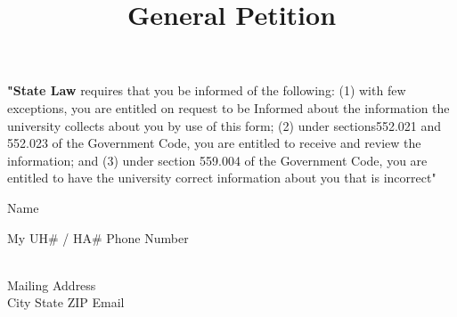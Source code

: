 \documentclass{article}
\begin{document}
\begin{Form}


\begin{multicols}{3}

\setlength{\hsize}{0.9\hsize}
\title*{\noindent \textbf{\Huge General Petition}}
\hfill
\columnbreak
\parbox{1.5\columnwidth}{\scriptsize{\textbf{"State Law} requires that you be informed of the following: (1) with few exceptions, you are entitled on request to be Informed about the information the university collects about you by use of this form; (2) under sections552.021 and 552.023 of the Government Code, you are entitled to receive and review the information; and (3) under section 559.004 of the Government Code, you are entitled to have the university correct information about you that is incorrect"} }

\end{multicols}

\begin{multicols}{2}


\noindent Name \hspace{0.5cm}\TextField[name=last-name, width=5.5cm]{}
\hspace{0.5cm}\TextField[name=first-name, width=5.5cm]{} \hspace{0.5cm}\TextField[name=middle-name, width=5.5cm]{} 
\vspace{1mm}
\noindent \hspace{1.3cm}
\hspace{3.9cm} 
\hspace{-0.7cm} 

\noindent \parbox{0.8\columnwidth}{My UH\# / HA\# \TextField[name=psid, width=4.3cm]{}
    Phone Number \TextField[name=phone, width=3cm]{}} 
\\[1mm]
\noindent Mailing Address \TextField[name=address, width=16.1cm]{} 
\\[1mm]
\noindent City \TextField[name=city, width=4cm]{}
State \TextField[name=state, width=2.5cm]{}
ZIP \TextField[name=zip, width=2cm]{}
Email \TextField[name=email, width=6.5cm]{}

\columnbreak


\end{multicols}
\end{Form}
\end{document}

